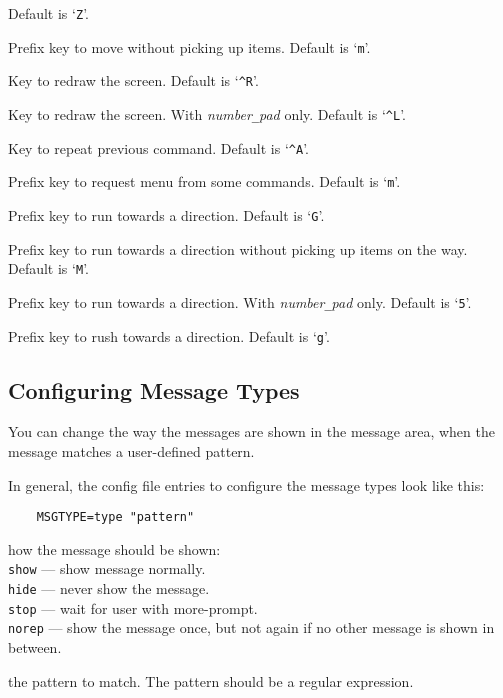 Default is `{\tt Z}'.
\item{}
Prefix key to move without picking up items. Default is `{\tt m}'.
\item{}
Key to redraw the screen. Default is `{\tt \^{}R}'.
\item{}
Key to redraw the screen. With {\it number\verb+_+pad\/} only.
Default is `{\tt \^{}L}'.
\item{}
Key to repeat previous command. Default is `{\tt \^{}A}'.
\item{}
Prefix key to request menu from some commands. Default is `{\tt m}'.
\item{}
Prefix key to run towards a direction. Default is `{\tt G}'.
\item{}
Prefix key to run towards a direction without picking up items on the way.
Default is `{\tt M}'.
\item{}
Prefix key to run towards a direction. With {\it number\verb+_+pad\/} only.
Default is `{\tt 5}'.
\item{}
Prefix key to rush towards a direction. Default is `{\tt g}'.
\elist
\elist


\subsection*{Configuring Message Types}

You can change the way the messages are shown in the message area, when
the message matches a user-defined pattern.

In general, the config file entries to configure the message types
look like this:
\begin{verbatim}
    MSGTYPE=type "pattern"
\end{verbatim}
\blist{}
\item[\ib{type}]
how the message should be shown:
\\
{\tt show}  --- show message normally.\\
{\tt hide}  --- never show the message.\\
{\tt stop}  --- wait for user with more-prompt.\\
{\tt norep} --- show the message once, but not again if no other message is
shown in between.
\item[\ib{pattern}]
the pattern to match. The pattern should be a regular expression.
\elist

